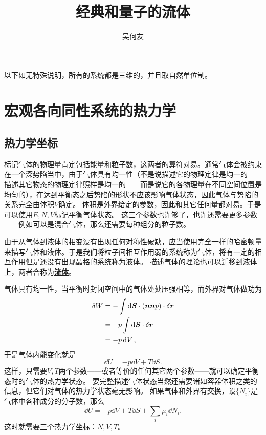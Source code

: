 \documentclass[hyperref, UTF8, a4paper]{ctexart}
\title{经典和量子的流体}
\author{吴何友}
\newcommand{\concept}[1]{\underline{\textbf{#1}}}
\begin{document}
\maketitle

以下如无特殊说明，所有的系统都是三维的，并且取自然单位制。

\section{宏观各向同性系统的热力学}

\subsection{热力学坐标}

标记气体的物理量肯定包括能量和粒子数，这两者的算符对易。通常气体会被约束在一个深势陷当中，由于气体具有均一性（不是说描述它的物理定律是均一的——描述其它物态的物理定律照样是均一的——而是说它的各物理量在不同空间位置是均匀的），在达到平衡态之后势陷的形状不应该影响气体状态，因此气体与势陷的关系完全由体积$V$确定。
体积是外界给定的参数，因此和其它任何量都对易。于是可以使用$E, N, V$标记平衡气体状态。
这三个参数也许够了，也许还需要更多参数——例如可以是混合气体，那么还需要每种组分的粒子数。

由于从气体到液体的相变没有出现任何对称性破缺，应当使用完全一样的哈密顿量来描写气体和液体。于是我们将粒子间相互作用弱的系统称为气体，将有一定的相互作用但是还没有出现晶格的系统称为液体。
描述气体的理论也可以迁移到液体上，两者合称为\concept{流体}。

气体具有均一性，当平衡时封闭空间中的气体处处压强相等，而外界对气体做功为
\[
    \begin{aligned}
        \var{W} &= - \int \dd{\vb*{S}} \cdot (\vb*{n} \vb*{n} p) \cdot \var{\vb*{r}} \\
        &= - p \int \dd{\vb*{S}} \cdot \var{\vb*{r}} \\
        &= - p \dd{V}, 
    \end{aligned}
\]
于是气体内能变化就是
\begin{equation}
    \dd{U} = -p \dd{V} + T \dd{S}.
    \label{eq:first-law-of-gas}
\end{equation}
这样，只需要$V, T$两个参数——或者等价的任何其它两个参数——就可以确定平衡态时的气体的热力学状态。
要完整描述气体状态当然还需要诸如容器体积之类的信息，但它们对气体的热力学状态毫无影响。
如果气体和外界有交换，设$\{N_i\}$是气体中各种成分的分子数，那么
\begin{equation}
    \dd{U} = -p \dd{V} + T \dd{S} + \sum_i \mu_i \dd{N_i}.
    \label{eq:first-law-of-gas-extended}
\end{equation}
这时就需要三个热力学坐标：$N, V, T$。
\end{document}

